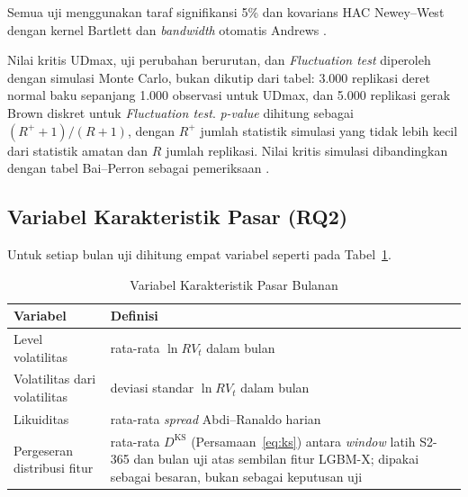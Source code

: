 Semua uji menggunakan taraf signifikansi 5\% dan kovarians HAC Newey--West
dengan kernel Bartlett dan \textit{bandwidth} otomatis Andrews
\cite{newey1987,andrews1991}.

Nilai kritis UDmax, uji perubahan berurutan, dan \textit{Fluctuation test}
diperoleh dengan simulasi Monte Carlo, bukan dikutip dari tabel: 3.000
replikasi deret normal baku sepanjang 1.000 observasi untuk UDmax, dan 5.000
replikasi gerak Brown diskret untuk \textit{Fluctuation test}.
\textit{p-value} dihitung sebagai $(R^{+}+1)/(R+1)$, dengan $R^{+}$ jumlah
statistik simulasi yang tidak lebih kecil dari statistik amatan dan $R$ jumlah
replikasi. Nilai kritis simulasi dibandingkan
dengan tabel Bai--Perron sebagai pemeriksaan \cite{bai1998}.


\subsection{Variabel Karakteristik Pasar (RQ2)}
\label{subsec:rq2var}
Untuk setiap bulan uji dihitung empat variabel seperti pada
Tabel~\ref{tab:rq2var}.

\begin{table}[htbp]
  \caption{Variabel Karakteristik Pasar Bulanan}
  \label{tab:rq2var}
  \centering
  \begingroup
  \small
  \begin{tabular}{|p{}|p{}|}
    \hline
    \textbf{Variabel} & \textbf{Definisi} \\
    \hline
    Level volatilitas & rata-rata $\ln RV_t$ dalam bulan \\
    \hline
    Volatilitas dari volatilitas & deviasi standar $\ln RV_t$ dalam bulan \\
    \hline
    Likuiditas & rata-rata \textit{spread} Abdi--Ranaldo harian
      \cite{abdi2017} \\
    \hline
    Pergeseran distribusi fitur & rata-rata $D^{\text{KS}}$
      (Persamaan~\eqref{eq:ks}) antara \textit{window} latih S2-365 dan bulan
      uji atas sembilan fitur LGBM-X; dipakai sebagai besaran, bukan sebagai
      keputusan uji \\
    \hline
  \end{tabular}
  \endgroup
\end{table}

